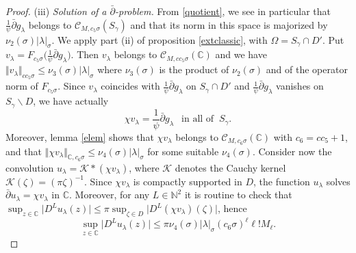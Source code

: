\documentclass[a4paper]{amsart}
\theoremstyle{plain}
\theoremstyle{definition}
\theoremstyle{remark}
\begin{document}
\begin{proof}
\noindent (iii) \textit{Solution of a $ \bar\partial $-problem.}
From \eqref{quotient}, we see in particular that $ \frac{1}{\psi}\bar\partial g_\lambda $ belongs to $ \mathcal{C}_{M,c_5\sigma}(S_\gamma) $ and that its norm in this space
is majorized by $ \nu_2(\sigma)\vert \lambda\vert_\sigma $. 
We apply part (ii) of proposition \ref{extclassic}, with $ \Omega=S_\gamma\cap D' $.
Put $ v_\lambda=F_{c_5\sigma}
\big(\frac{1}{\psi}\bar\partial g_\lambda\big) $. Then 
$ v_\lambda $ belongs to $ \mathcal{C}_{M,cc_5\sigma}(\mathbb{C}) $ and we have $ \Vert v_\lambda\Vert_{cc_5\sigma}\leq \nu_3(\sigma)\vert \lambda\vert_\sigma $ where $ \nu_3(\sigma) $ is the product of
$ \nu_2(\sigma) $ and of the operator norm of $ F_{c_5\sigma} $. 
Since $ v_\lambda $ coincides
with $ \frac{1}{\psi}\bar\partial g_\lambda $ on
$ S_\gamma\cap D' $ and $ \frac{1}{\psi}\bar\partial g_\lambda $
vanishes on $ S_\gamma\backslash D $, we have actually
\begin{equation}\label{coinc}
\chi v_\lambda = \frac{1}{\psi}\bar\partial g_\lambda\ \ \textrm{ in all of }\ S_\gamma.
\end{equation}
Moreover, lemma \ref{elem} shows that $ \chi v_\lambda $ 
belongs to $ \mathcal{C}_{M,c_6\sigma}(\mathbb{C}) $ with $ c_6=cc_5+1 $, and that
$ \Vert\chi v_\lambda\Vert_{\mathbb{C},c_6\sigma}\leq 
\nu_4(\sigma)\vert \lambda\vert_\sigma $ for some suitable $ \nu_4(\sigma) $. 
Consider now the convolution $ u_\lambda=\mathcal{K}*(\chi v_\lambda) $, where $ \mathcal{K} $ denotes the Cauchy kernel $ \mathcal{K}(\zeta)=(\pi\zeta)^{-1} $. Since $ \chi v_\lambda $ is
compactly supported in $ D $, the function $ u_\lambda $ solves $ \bar\partial u_\lambda=\chi v_\lambda $ in $ \mathbb{C} $. Moreover, for any $ L\in\mathbb{N}^2 $ it is routine to check that 
$\sup_{z\in\mathbb{C}}\vert D^L u_\lambda(z)\vert\leq \pi\sup_{\zeta\in D}\vert D^L(\chi v_\lambda)(\zeta)\vert$, hence
\begin{equation}\label{estimu} 
\sup_{z\in\mathbb{C}}\vert D^L u_\lambda(z)\vert\leq 
\pi\nu_4(\sigma)\vert\lambda\vert_\sigma (c_6\sigma)^\ell \ell!M_\ell.
\end{equation}


\end{proof}
\end{document}
